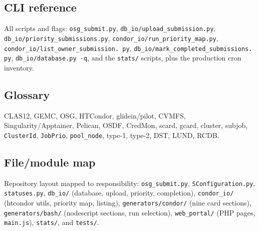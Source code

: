 \subsection{CLI reference}

All scripts and flags: \texttt{osg\_\allowbreak{}submit.\allowbreak{}py},
\texttt{db\_\allowbreak{}io/\allowbreak{}upload\_\allowbreak{}submission.\allowbreak{}py},
\texttt{db\_\allowbreak{}io/\allowbreak{}priority\_\allowbreak{}submissions.\allowbreak{}py},
\texttt{condor\_\allowbreak{}io/\allowbreak{}run\_\allowbreak{}priority\_\allowbreak{}map.\allowbreak{}py},
\texttt{condor\_\allowbreak{}io/\allowbreak{}list\_\allowbreak{}owner\_\allowbreak{}submission.\allowbreak{}%
py},
\texttt{db\_\allowbreak{}io/\allowbreak{}mark\_\allowbreak{}completed\_\allowbreak{}submissions.\allowbreak{}%
py}, \texttt{db\_\allowbreak{}io/\allowbreak{}database.\allowbreak{}py -\allowbreak{}q}, and the
\texttt{stats/\allowbreak{}} scripts, plus the production cron inventory.

\subsection{Glossary}

CLAS12, GEMC, OSG, HTCondor, glidein/pilot, CVMFS, Singularity/Apptainer, Pelican, OSDF, CredMon, scard, gcard,
cluster, subjob, \texttt{ClusterId}, \texttt{JobPrio}, \texttt{pool\_\allowbreak{}node}, type-1, type-2, DST,
LUND, RCDB.

\subsection{File/module map}

Repository layout mapped to responsibility: \texttt{osg\_\allowbreak{}submit.\allowbreak{}py},
\texttt{SConfiguration.\allowbreak{}py}, \texttt{statuses.\allowbreak{}py},
\texttt{db\_\allowbreak{}io/\allowbreak{}} (database, upload, priority, completion),
\texttt{condor\_\allowbreak{}io/\allowbreak{}} (htcondor utils, priority map, listing),
\texttt{generators/\allowbreak{}condor/\allowbreak{}} (nine card sections),
\texttt{generators/\allowbreak{}bash/\allowbreak{}} (nodescript sections, run selection),
\texttt{web\_\allowbreak{}portal/\allowbreak{}} (PHP pages, \texttt{main.\allowbreak{}js}),
\texttt{stats/\allowbreak{}}, and \texttt{tests/\allowbreak{}}.
